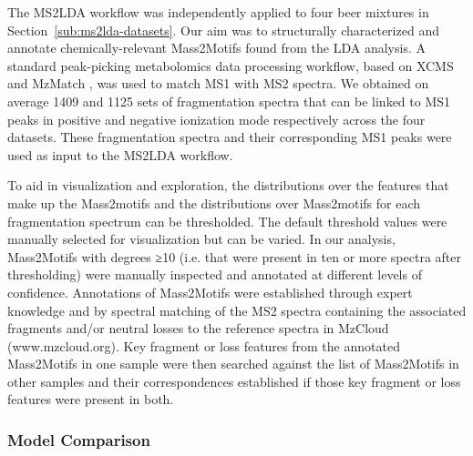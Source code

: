 The MS2LDA workflow was independently applied to four beer mixtures in Section~\ref{sub:ms2lda-datasets}. Our aim was to structurally characterized and annotate chemically-relevant Mass2Motifs found from the LDA analysis. A standard peak-picking metabolomics data processing workflow, based on XCMS \cite{Smith2006} and MzMatch \cite{Scheltema2011}, was used to match MS1 with MS2 spectra. We obtained on average 1409 and 1125 sets of fragmentation spectra that can be linked to MS1 peaks in positive and negative ionization mode respectively across the four datasets. These fragmentation spectra and their corresponding MS1 peaks were used as input to the MS2LDA workflow. 

To aid in visualization and exploration, the distributions over the features that make up the Mass2motifs and the distributions over Mass2motifs for each fragmentation spectrum can be thresholded. The default threshold values were manually selected for visualization but can be varied. In our analysis, Mass2Motifs with degrees ≥10 (i.e. that were present in ten or more spectra after thresholding) were manually inspected and annotated at different levels of confidence. Annotations of Mass2Motifs were established through expert knowledge and by spectral matching of the MS2 spectra containing the associated fragments and/or neutral losses to the reference spectra in MzCloud (www.mzcloud.org). Key fragment or loss features from the annotated Mass2Motifs in one sample were then searched against the list of Mass2Motifs in other samples and their correspondences established if those key fragment or loss features were present in both.

\subsubsection{Model Comparison}

